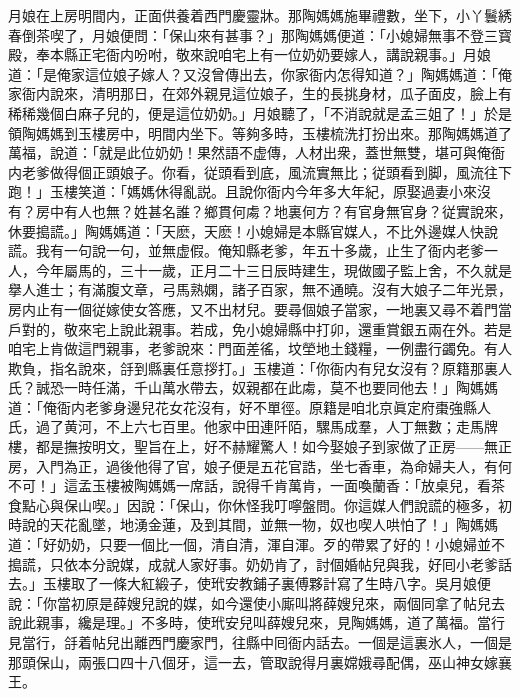 月娘在上房明間内，正面供養着西門慶靈牀。那陶媽媽施畢禮數，坐下，小丫鬟綉春倒茶喫了，月娘便問：「保山來有甚事？」那陶媽媽便道：「小媳婦無事不登三寳殿，奉本縣正宅衙内吩咐，敬來說咱宅上有一位奶奶要嫁人，講說親事。」月娘道：「是俺家這位娘子嫁人？又沒曾傳出去，你家衙内怎得知道？」陶媽媽道：「俺家衙内說來，清明那日，在郊外親見這位娘子，生的長挑身材，瓜子面皮，臉上有稀稀幾個白麻子兒的，便是這位奶奶。」月娘聽了，「不消說就是孟三姐了！」於是領陶媽媽到玉樓房中，明間内坐下。等夠多時，玉樓梳洗打扮出來。那陶媽媽道了萬福，說道：「就是此位奶奶！果然語不虚傳，人材出衆，蓋世無雙，堪可與俺衙内老爹做得個正頭娘子。你看，従頭看到底，風流實無比；従頭看到脚，風流往下跑！」玉樓笑道：「媽媽休得亂説。且說你衙内今年多大年紀，原娶過妻小來沒有？房中有人也無？姓甚名誰？鄉貫何䖏？地裏何方？有官身無官身？従實說來，休要搗謊。」陶媽媽道：「天麽，天麽！小媳婦是本縣官媒人，不比外邊媒人快說謊。我有一句說一句，並無虚假。俺知縣老爹，年五十多歲，止生了衙内老爹一人，今年屬馬的，三十一歲，正月二十三日辰時建生，現做國子監上舍，不久就是擧人進士；有滿腹文章，弓馬熟嫻，諸子百家，無不通曉。沒有大娘子二年光景，房内止有一個従嫁使女答應，又不出材兒。要尋個娘子當家，一地裏又尋不着門當戶對的，敬來宅上說此親事。若成，免小媳婦縣中打卯，還重賞銀五兩在外。若是咱宅上肯做這門親事，老爹說來：門面差徭，坟塋地土錢糧，一例盡行蠲免。有人欺負，指名說來，㧱到縣裏任意拶打。」玉樓道：「你衙内有兒女沒有？原籍那裏人氏？誠恐一時任滿，千山萬水帶去，奴親都在此䖏，莫不也要同他去！」陶媽媽道：「俺衙内老爹身邊兒花女花沒有，好不單徑。原籍是咱北京眞定府棗強縣人氏，過了黄河，不上六七百里。他家中田連阡陌，騾馬成羣，人丁無數；走馬牌樓，都是撫按明文，聖旨在上，好不赫耀驚人！如今娶娘子到家做了正房——無正房，入門為正，過後他得了官，娘子便是五花官誥，坐七香車，為命婦夫人，有何不可！」這孟玉樓被陶媽媽一席話，說得千肯萬肯，一面喚蘭香：「放桌兒，看茶食點心與保山喫。」因說：「保山，你休怪我叮嚀盤問。你這媒人們說謊的極多，初時說的天花亂墜，地湧金蓮，及到其間，並無一物，奴也喫人哄怕了！」陶媽媽道：「好奶奶，只要一個比一個，清自清，渾自渾。歹的帶累了好的！小媳婦並不搗謊，只依本分說媒，成就人家好事。奶奶肯了，討個婚帖兒與我，好囘小老爹話去。」玉樓取了一條大紅緞子，使玳安教鋪子裏傅夥計寫了生時八字。吳月娘便說：「你當初原是薛嫂兒說的媒，如今還使小廝叫將薛嫂兒來，兩個同拿了帖兒去說此親事，纔是理。」不多時，使玳安兒叫薛嫂兒來，見陶媽媽，道了萬福。當行見當行，㧱着帖兒出離西門慶家門，往縣中囘衙内話去。一個是這裏氷人，一個是那頭保山，兩張口四十八個牙，這一去，管取說得月裏嫦娥尋配偶，巫山神女嫁襄王。

